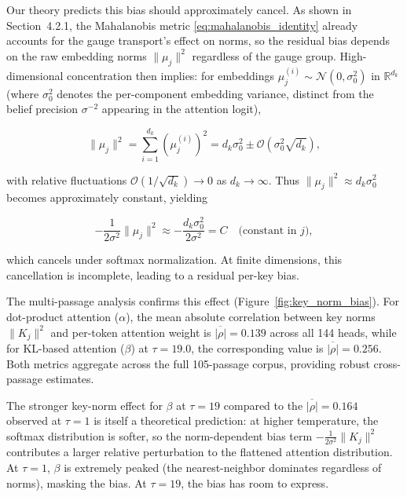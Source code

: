 \documentclass[twoside,11pt]{article}
\begin{document}
Our theory predicts this bias should approximately cancel. As shown in Section~4.2.1, the Mahalanobis metric \eqref{eq:mahalanobis_identity} already accounts for the gauge transport's effect on norms, so the residual bias depends on the raw embedding norms $\|\mu_j\|^2$ regardless of the gauge group. High-dimensional concentration then implies: for embeddings $\mu_j^{(i)} \sim \mathcal{N}(0, \sigma_0^2)$ in $\mathbb{R}^{d_k}$ (where $\sigma_0^2$ denotes the per-component embedding variance, distinct from the belief precision $\sigma^{-2}$ appearing in the attention logit),

\begin{equation}
\|\mu_j\|^2 = \sum_{i=1}^{d_k} (\mu_j^{(i)})^2 = d_k\sigma_0^2 \pm \mathcal{O}(\sigma_0^2\sqrt{d_k}),
\end{equation}

with relative fluctuations $\mathcal{O}(1/\sqrt{d_k}) \to 0$ as $d_k \to \infty$. Thus $\|\mu_j\|^2 \approx d_k\sigma_0^2$ becomes approximately constant, yielding

\begin{equation}
-\frac{1}{2\sigma^2}\|\mu_j\|^2 \approx -\frac{d_k\sigma_0^2}{2\sigma^2} = C \quad \text{(constant in $j$)},
\end{equation}

which cancels under softmax normalization. At finite dimensions, this cancellation is incomplete, leading to a residual per-key bias.

The multi-passage analysis confirms this effect (Figure~\ref{fig:key_norm_bias}). For dot-product attention ($\alpha$), the mean absolute correlation between key norms $\|K_j\|^2$ and per-token attention weight is $\overline{|\rho|} = 0.139$ across all 144 heads, while for KL-based attention ($\beta$) at $\tau = 19.0$, the corresponding value is $\overline{|\rho|} = 0.256$. Both metrics aggregate across the full 105-passage corpus, providing robust cross-passage estimates.

The stronger key-norm effect for $\beta$ at $\tau = 19$ compared to the $\overline{|\rho|} = 0.164$ observed at $\tau = 1$ is itself a theoretical prediction: at higher temperature, the softmax distribution is softer, so the norm-dependent bias term $-\frac{1}{2\sigma^2}\|K_j\|^2$ contributes a larger relative perturbation to the flattened attention distribution. At $\tau = 1$, $\beta$ is extremely peaked (the nearest-neighbor dominates regardless of norms), masking the bias. At $\tau = 19$, the bias has room to express.
\end{document}
